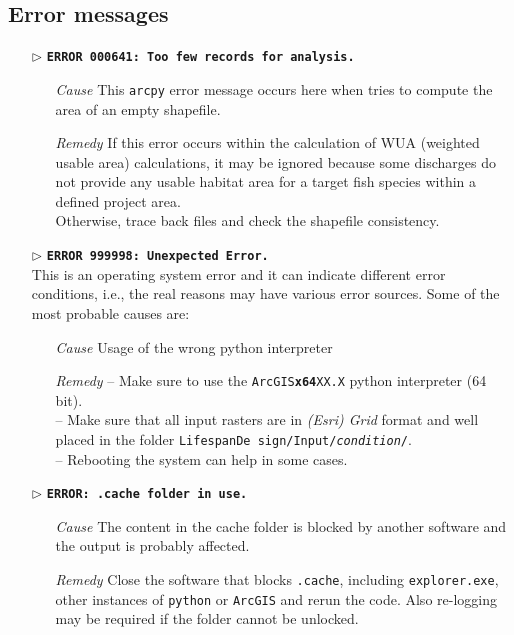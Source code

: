\subsection{Error messages}\label{sec:errors}
\begin{itemize}
	
	\item[$\triangleright$] \textbf{\texttt{ERROR 000641: Too few records for analysis.}}\\		
	\begin{itemize}
		\item[\textit{Cause}\hspace{0.27cm}] This \texttt{arcpy} error message occurs here when  tries to compute the area of an empty shapefile.
		\item[\textit{Remedy}] If this error occurs within the calculation of WUA (weighted usable area) calculations, it may be ignored because some discharges do not provide any usable habitat area for a target fish species within a defined project area.\\
		Otherwise, trace back files and check the shapefile consistency.\\
	\end{itemize}
	
	\item[$\triangleright$] \textbf{\texttt{ERROR 999998: Unexpected Error.}}\\
This is an operating system error and it can indicate different error conditions, i.e., the real reasons may have various error sources. Some of the most probable causes are:
	\begin{itemize}
		\item[\textit{Cause}\hspace{0.27cm}] Usage of the wrong python interpreter
		\item[\textit{Remedy}] -- Make sure to use the \texttt{ArcGIS\textbf{x64}XX.X} python interpreter (64 bit).\\
							   -- Make sure that all input rasters are in \textit{(Esri) Grid} format and well placed in the folder \texttt{LifespanDe sign/Input/\textit{condition}/}.\\
							   -- Rebooting the system can help in some cases.\\
	\end{itemize}
	
	\item[$\triangleright$] \textbf{\texttt{ERROR: .cache folder in use.}}
	\begin{itemize}
		\item[\textit{Cause}\hspace{0.27cm}] The content in the cache folder is blocked by another software and the output is probably affected.
		\item[\textit{Remedy}] Close the software that blocks \texttt{.cache}, including \texttt{explorer.exe}, other instances of \texttt{python} or \texttt{ArcGIS} and rerun the code. Also re-logging may be required if the folder cannot be unlocked.\\
	\end{itemize}
	

\end{itemize}
